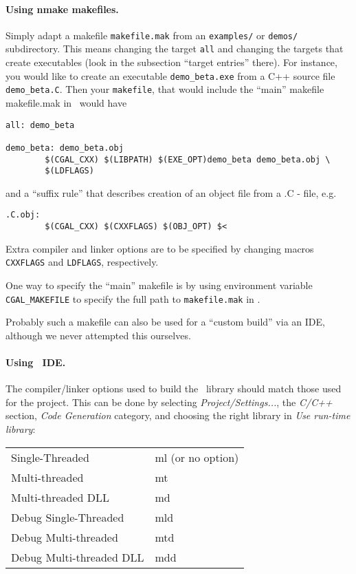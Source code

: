 \paragraph{Using nmake makefiles.}
Simply adapt a makefile \texttt{makefile.mak} 
from an \texttt{examples/} or \texttt{demos/} subdirectory.
This means changing the target \texttt{all} and changing the targets that
create executables (look in the subsection ``target entries'' there).
For instance, you would like to create an executable \texttt{demo\_beta.exe}
from a C++ source file \texttt{demo\_beta.C}.  Then your 
\texttt{makefile}, that would
include the ``main'' makefile makefile.mak in \CGALR\ would have
\begin{verbatim}
all: demo_beta

demo_beta: demo_beta.obj
        $(CGAL_CXX) $(LIBPATH) $(EXE_OPT)demo_beta demo_beta.obj \
        $(LDFLAGS)
\end{verbatim}

and a ``suffix rule'' that describes creation of an object file from a
.C - file, e.g.
\begin{verbatim}
.C.obj:
        $(CGAL_CXX) $(CXXFLAGS) $(OBJ_OPT) $<
\end{verbatim}

Extra compiler and linker options are to be specified by changing
macros \texttt{CXXFLAGS} and \texttt{LDFLAGS}, respectively.

One way to specify the ``main'' makefile is by using environment
variable \texttt{CGAL\_MAKEFILE} to specify the full path to 
\texttt{makefile.mak} in
\CGALR .

Probably such a makefile can also be used for a ``custom build'' via an
IDE, although we never attempted this ourselves.


\paragraph{Using \msvc\ IDE.}
The compiler/linker options used to build the \cgal\ library should
match those used for the project. This can be done by
selecting {\em Project/Settings...}, the {\em C/C++} section,
{\em Code Generation} category, and choosing the right
library in {\em Use run-time library}:

\begin{tabular}{|l|l|} \hline
Single-Threaded&                 ml (or no option)\\
Multi-threaded &                 mt\\
Multi-threaded DLL&              md\\
Debug Single-Threaded &          mld\\
Debug Multi-threaded   &         mtd\\
Debug Multi-threaded DLL&        mdd\\\hline
\end{tabular}

